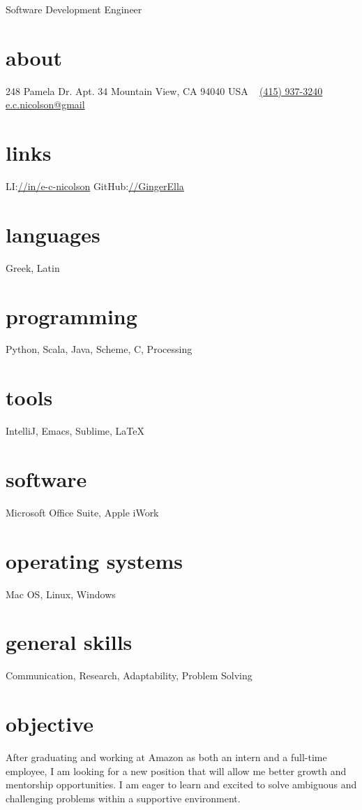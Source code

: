 \documentclass[]{friggeri-cv}
\begin{document}
       {Software Development Engineer}


\begin{aside}
  \section{about}
    248 Pamela Dr.
    Apt. 34
    Mountain View, CA 94040
    USA
    ~
    \href{mailto:mobile}{(415) 937-3240}
    \href{mailto:email1}{e.c.nicolson@gmail}
  \section{links}
    LI:\href{https://www.linkedin.com/in/e-c-nicolson}{//in/e-c-nicolson}
    GitHub:\href{https://github.com/GingerElla}{//GingerElla}
  \section{languages}
    Greek, Latin
  \section{programming}
    Python, Scala, Java, Scheme, C, Processing
  \section{tools}
    IntelliJ, Emacs, Sublime, \LaTeX
  \section{software}
    Microsoft Office Suite,
    Apple iWork
  \section{operating systems}
    Mac OS, Linux, Windows
  \section{general skills}
  	Communication, 
  	Research, Adaptability,
  	Problem Solving
\end{aside}

\section{objective}

After graduating and working at Amazon as both an intern and a full-time employee, I am looking for a new position that will allow me better growth and mentorship opportunities. I am eager to learn and excited to solve ambiguous and challenging problems within a supportive environment.
\end{document}
